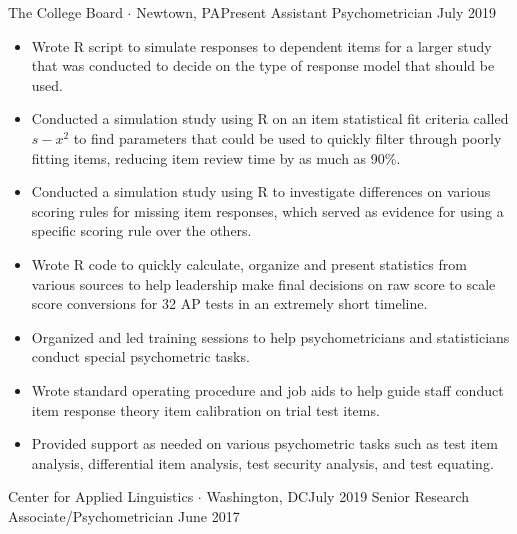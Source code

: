 %
%
%
\begin{experiences}
 \experience
    {The College Board $\cdot$ Newtown, PA}{Present }
    {Assistant Psychometrician}
    {July 2019 }    {
       \begin{itemize}
	\item Wrote R script to simulate responses to dependent items for a larger study that was conducted to decide on the type of response model that should be used.    
	\item Conducted a simulation study using R on an item statistical fit criteria called $s-x^2$ to find parameters that could be used to quickly filter through poorly fitting items, reducing item review time by as much as 90\%.  
	\item Conducted a simulation study using R to investigate differences on various scoring rules for missing item responses, which served as evidence for using a specific scoring rule over the others.
	\item Wrote R code to quickly calculate, organize and present statistics from various sources to help leadership make final decisions on raw score to scale score conversions for 32 AP tests in an extremely short timeline.
	\item Organized and led training sessions to help psychometricians and statisticians conduct special psychometric tasks.   
	\item Wrote standard operating procedure and job aids to help guide staff conduct item response theory item calibration on trial test items. 
	\item Provided support as needed on various psychometric tasks such as test item analysis, differential item analysis, test security analysis, and test equating.
  
       \end{itemize}
                    }

  \emptySeparator  


	\experience
    {Center for Applied Linguistics $\cdot$ Washington, DC}{July 2019}
    {Senior Research Associate/Psychometrician}
    {June 2017} {
      \begin{itemize}


\end{itemize}}
\end{experiences}
